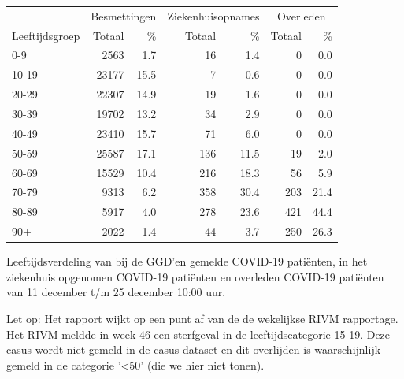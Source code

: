 \documentclass[
  english,
  man,floatsintext]{apa6}
\begin{document}
\begin{table}[H]
\centering\begingroup\fontsize{11}{13}\selectfont

\begin{threeparttable}
\begin{tabular}{lrrrrrr}
\toprule
\multicolumn{1}{c}{ } & \multicolumn{2}{c}{Besmettingen} & \multicolumn{2}{c}{Ziekenhuisopnames} & \multicolumn{2}{c}{Overleden} \\
\cmidrule(l{3pt}r{3pt}){2-3} \cmidrule(l{3pt}r{3pt}){4-5} \cmidrule(l{3pt}r{3pt}){6-7}
Leeftijdsgroep & Totaal & \% & Totaal & \% & Totaal & \%\\
\midrule
0-9 & 2563 & 1.7 & 16 & 1.4 & 0 & 0.0\\
10-19 & 23177 & 15.5 & 7 & 0.6 & 0 & 0.0\\
20-29 & 22307 & 14.9 & 19 & 1.6 & 0 & 0.0\\
30-39 & 19702 & 13.2 & 34 & 2.9 & 0 & 0.0\\
40-49 & 23410 & 15.7 & 71 & 6.0 & 0 & 0.0\\
50-59 & 25587 & 17.1 & 136 & 11.5 & 19 & 2.0\\
60-69 & 15529 & 10.4 & 216 & 18.3 & 56 & 5.9\\
70-79 & 9313 & 6.2 & 358 & 30.4 & 203 & 21.4\\
80-89 & 5917 & 4.0 & 278 & 23.6 & 421 & 44.4\\
90+ & 2022 & 1.4 & 44 & 3.7 & 250 & 26.3\\
\bottomrule
\end{tabular}
\begin{tablenotes}
\item[1] Leeftijdsverdeling van bij de GGD’en gemelde COVID-19 patiënten, in het ziekenhuis opgenomen COVID-19 patiënten en overleden COVID-19 patiënten van 11 december t/m 25 december 10:00 uur.
\item[2] Let op: Het rapport wijkt op een punt af van de de wekelijkse RIVM rapportage. Het RIVM meldde in week 46 een sterfgeval in de leeftijdscategorie 15-19. Deze casus wordt niet gemeld in de casus dataset en dit overlijden is waarschijnlijk gemeld in de categorie '<50' (die we hier niet tonen).
\end{tablenotes}
\end{threeparttable}
\endgroup{}
\end{table}

\newpage
\end{document}
